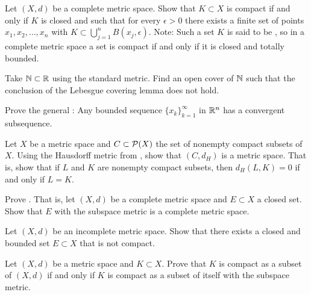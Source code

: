 \begin{exercise}[Challenging] \label{exercise:mstotbound}
Let $(X,d)$ be a complete metric space.
Show that $K \subset X$ is compact if and only if $K$ is closed
and such that for every $\epsilon > 0$
there exists a finite set of points $x_1,x_2,\ldots,x_n$ with
$K \subset \bigcup_{j=1}^n B(x_j,\epsilon)$.
Note: Such a set $K$ is said to be \emph{},
so in a complete metric space a set is compact if and only
if it is closed and totally bounded.
\end{exercise}

\begin{exercise}
Take ${\mathbb{N}} \subset {\mathbb{R}}$ using the standard metric.  Find an open cover of ${\mathbb{N}}$
such that the conclusion of the Lebesgue covering lemma does not hold.
\end{exercise}

\begin{exercise}
Prove the general :
Any bounded sequence $\{ x_k \}_{k=1}^\infty$ in ${\mathbb{R}}^n$
has a convergent subsequence.
\end{exercise}

\begin{exercise}
Let $X$ be a metric space and
$C \subset {\mathcal{P}}(X)$ the set of nonempty compact subsets of $X$.
Using the Hausdorff metric from ,
show that $(C,d_H)$ is a metric space.  That is, show that
if $L$ and $K$ are nonempty compact subsets, then $d_H(L,K) = 0$
if and only if $L=K$.
\end{exercise}

\begin{exercise} \label{exercise:closedcomplete}
Prove .  That is,
let $(X,d)$ be a complete metric space and $E \subset X$ a closed set.
Show that $E$ with the subspace metric is a complete metric space.
\end{exercise}

\begin{exercise}
Let $(X,d)$ be an incomplete metric space.  Show that there exists a
closed and bounded set $E \subset X$ that is not compact.
\end{exercise}

\begin{exercise}
Let $(X,d)$ be a metric space and $K \subset X$.
Prove that $K$ is compact as a subset of $(X,d)$ if and only if $K$ is
compact as a subset of itself with the subspace metric.
\end{exercise}

